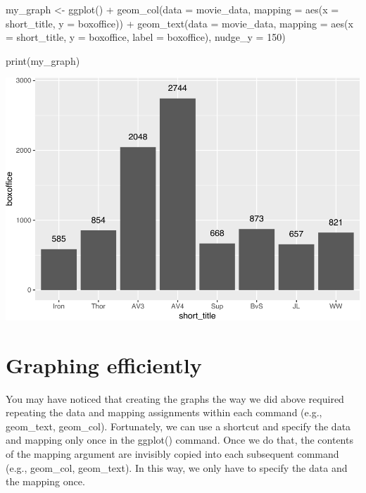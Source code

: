 \documentclass[
]{krantz}
\makeatletter
\newenvironment{Shaded}{\begin{snugshade}}{\end{snugshade}}
\newcommand{\AttributeTok}[1]{\textcolor[rgb]{0.61,0.61,0.61}{#1}}
\newcommand{\DecValTok}[1]{\textcolor[rgb]{0.06,0.06,0.06}{#1}}
\newcommand{\FunctionTok}[1]{\textcolor[rgb]{0,0,0}{#1}}
\newcommand{\NormalTok}[1]{#1}
\newcommand{\OtherTok}[1]{\textcolor[rgb]{0.37,0.37,0.37}{#1}}
\newcommand{\SpecialCharTok}[1]{\textcolor[rgb]{0,0,0}{#1}}
\newenvironment{kframe}{%
\medskip{}
\setlength{\fboxsep}{.8em}
 \def\at@end@of@kframe{}%
 \ifinner\ifhmode%
  \def\at@end@of@kframe{\end{minipage}}%
  \begin{minipage}{\columnwidth}%
 \fi\fi%
 \def\FrameCommand##1{\hskip\@totalleftmargin \hskip-\fboxsep
 \colorbox{shadecolor}{##1}\hskip-\fboxsep
     \hskip-\linewidth \hskip-\@totalleftmargin \hskip\columnwidth}%
 \MakeFramed {\advance\hsize-\width
   \@totalleftmargin\z@ \linewidth\hsize
   \@setminipage}}%
 {\par\unskip\endMakeFramed%
 \at@end@of@kframe}
\renewenvironment{Shaded}{\begin{kframe}}{\end{kframe}}
\makeatother
\begin{document}
\begin{Shaded}
\begin{Highlighting}[]
\NormalTok{my\_graph }\OtherTok{\textless{}{-}} \FunctionTok{ggplot}\NormalTok{() }\SpecialCharTok{+}
  \FunctionTok{geom\_col}\NormalTok{(}\AttributeTok{data =}\NormalTok{ movie\_data,}
           \AttributeTok{mapping =} \FunctionTok{aes}\NormalTok{(}\AttributeTok{x =}\NormalTok{ short\_title, }
                         \AttributeTok{y =}\NormalTok{ boxoffice)) }\SpecialCharTok{+}
  \FunctionTok{geom\_text}\NormalTok{(}\AttributeTok{data =}\NormalTok{ movie\_data, }
           \AttributeTok{mapping =} \FunctionTok{aes}\NormalTok{(}\AttributeTok{x =}\NormalTok{ short\_title, }
                         \AttributeTok{y =}\NormalTok{ boxoffice, }
                         \AttributeTok{label =}\NormalTok{ boxoffice),}
           \AttributeTok{nudge\_y =} \DecValTok{150}\NormalTok{)}

\FunctionTok{print}\NormalTok{(my\_graph)}
\end{Highlighting}
\end{Shaded}

\includegraphics[width=0.65\linewidth]{bookdown_files/figure-latex/unnamed-chunk-103-1}

\hypertarget{graphing-efficiently}{%
\section{Graphing efficiently}\label{graphing-efficiently}}

You may have noticed that creating the graphs the way we did above required repeating the data and mapping assignments within each command (e.g., geom\_text, geom\_col). Fortunately, we can use a shortcut and specify the data and mapping only once in the ggplot() command. Once we do that, the contents of the mapping argument are invisibly copied into each subsequent command (e.g., geom\_col, geom\_text). In this way, we only have to specify the data and the mapping once.
\end{document}
